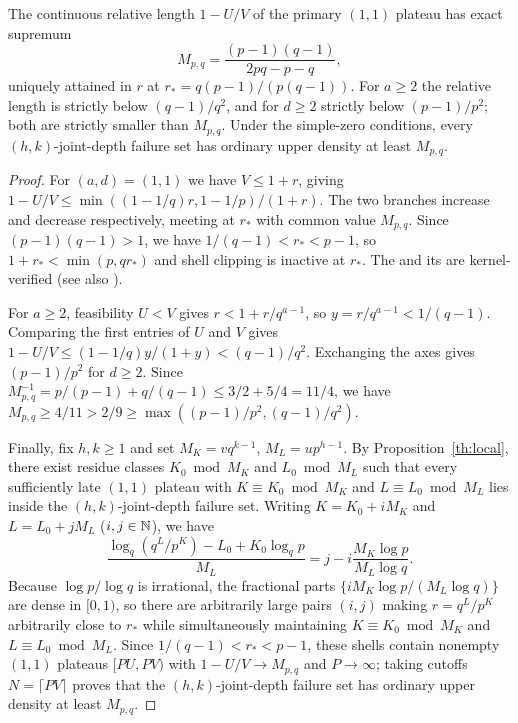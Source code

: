 \documentclass[11pt]{article}
\begin{document}
\begin{proposition}\label{th:shape}
The continuous relative length $1-U/V$ of the primary $(1,1)$ plateau has exact supremum
\[
 M_{p,q}=\frac{(p-1)(q-1)}{2pq-p-q},
\]
uniquely attained in $r$ at $r_*=q(p-1)/(p(q-1))$. For $a\ge2$ the relative length is strictly below $(q-1)/q^2$, and for $d\ge2$ strictly below $(p-1)/p^2$; both are strictly smaller than $M_{p,q}$. Under the simple-zero conditions, every $(h,k)$-joint-depth failure set has ordinary upper density at least $M_{p,q}$.
\end{proposition}
\begin{proof}
For $(a,d)=(1,1)$ we have $V\le1+r$, giving $1-U/V\le\min((1-1/q)r,1-1/p)/(1+r)$. The two branches increase and decrease respectively, meeting at $r_*$ with common value $M_{p,q}$. Since $(p-1)(q-1)>1$, we have $1/(q-1)<r_*<p-1$, so $1+r_*<\min(p,qr_*)$ and shell clipping is inactive at $r_*$. The  and its  are kernel-verified (see also ).

For $a\ge2$, feasibility $U<V$ gives $r<1+r/q^{a-1}$, so $y=r/q^{a-1}<1/(q-1)$. Comparing the first entries of $U$ and $V$ gives $1-U/V\le(1-1/q)y/(1+y)<(q-1)/q^2$. Exchanging the axes gives $(p-1)/p^2$ for $d\ge2$. Since $M_{p,q}^{-1}=p/(p-1)+q/(q-1)\le3/2+5/4=11/4$, we have $M_{p,q}\ge4/11>2/9\ge\max((p-1)/p^2,(q-1)/q^2)$.

Finally, fix $h,k\ge1$ and set $M_K=vq^{k-1}$, $M_L=up^{h-1}$. By Proposition~\ref{th:local}, there exist residue classes $K_0\bmod M_K$ and $L_0\bmod M_L$ such that every sufficiently late $(1,1)$ plateau with $K\equiv K_0\bmod M_K$ and $L\equiv L_0\bmod M_L$ lies inside the $(h,k)$-joint-depth failure set. Writing $K=K_0+iM_K$ and $L=L_0+jM_L$ ($i,j\in\mathbb N$), we have
\[
 \frac{\log_q(q^L/p^K)-L_0+K_0\log_q p}{M_L}=j-i\frac{M_K\log p}{M_L\log q}.
\]
Because $\log p/\log q$ is irrational, the fractional parts $\{iM_K\log p/(M_L\log q)\}$ are dense in $[0,1)$, so there are arbitrarily large pairs $(i,j)$ making $r=q^L/p^K$ arbitrarily close to $r_*$ while simultaneously maintaining $K\equiv K_0\bmod M_K$ and $L\equiv L_0\bmod M_L$. Since $1/(q-1)<r_*<p-1$, these shells contain nonempty $(1,1)$ plateaus $[PU,PV)$ with $1-U/V\to M_{p,q}$ and $P\to\infty$; taking cutoffs $N=\lceil PV\rceil$ proves that the $(h,k)$-joint-depth failure set has ordinary upper density at least $M_{p,q}$.
\end{proof}
\end{document}
